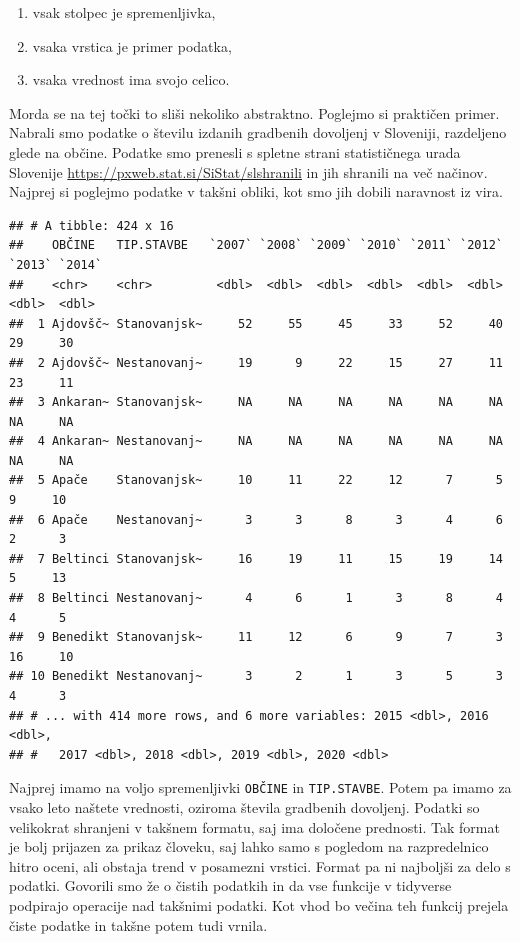 \documentclass[
]{book}
\providecommand{\tightlist}{%
  \setlength{\itemsep}{0pt}\setlength{\parskip}{0pt}}
\begin{document}
\begin{enumerate}
\def\labelenumi{\arabic{enumi})}
\tightlist
\item
  vsak stolpec je spremenljivka,
\item
  vsaka vrstica je primer podatka,
\item
  vsaka vrednost ima svojo celico.
\end{enumerate}

Morda se na tej točki to sliši nekoliko abstraktno. Poglejmo si praktičen primer. Nabrali smo podatke o številu izdanih gradbenih dovoljenj v Sloveniji, razdeljeno glede na občine. Podatke smo prenesli s spletne strani statističnega urada Slovenije \url{https://pxweb.stat.si/SiStat/slshranili} in jih shranili na več načinov. Najprej si poglejmo podatke v takšni obliki, kot smo jih dobili naravnost iz vira.

\begin{verbatim}
## # A tibble: 424 x 16
##    OBČINE   TIP.STAVBE   `2007` `2008` `2009` `2010` `2011` `2012` `2013` `2014`
##    <chr>    <chr>         <dbl>  <dbl>  <dbl>  <dbl>  <dbl>  <dbl>  <dbl>  <dbl>
##  1 Ajdovšč~ Stanovanjsk~     52     55     45     33     52     40     29     30
##  2 Ajdovšč~ Nestanovanj~     19      9     22     15     27     11     23     11
##  3 Ankaran~ Stanovanjsk~     NA     NA     NA     NA     NA     NA     NA     NA
##  4 Ankaran~ Nestanovanj~     NA     NA     NA     NA     NA     NA     NA     NA
##  5 Apače    Stanovanjsk~     10     11     22     12      7      5      9     10
##  6 Apače    Nestanovanj~      3      3      8      3      4      6      2      3
##  7 Beltinci Stanovanjsk~     16     19     11     15     19     14      5     13
##  8 Beltinci Nestanovanj~      4      6      1      3      8      4      4      5
##  9 Benedikt Stanovanjsk~     11     12      6      9      7      3     16     10
## 10 Benedikt Nestanovanj~      3      2      1      3      5      3      4      3
## # ... with 414 more rows, and 6 more variables: 2015 <dbl>, 2016 <dbl>,
## #   2017 <dbl>, 2018 <dbl>, 2019 <dbl>, 2020 <dbl>
\end{verbatim}

Najprej imamo na voljo spremenljivki \texttt{OBČINE} in \texttt{TIP.STAVBE}. Potem pa imamo za vsako leto naštete vrednosti, oziroma števila gradbenih dovoljenj. Podatki so velikokrat shranjeni v takšnem formatu, saj ima določene prednosti. Tak format je bolj prijazen za prikaz človeku, saj lahko samo s pogledom na razpredelnico hitro oceni, ali obstaja trend v posamezni vrstici. Format pa ni najboljši za delo s podatki. Govorili smo že o čistih podatkih in da vse funkcije v tidyverse podpirajo operacije nad takšnimi podatki. Kot vhod bo večina teh funkcij prejela čiste podatke in takšne potem tudi vrnila.
\end{document}
